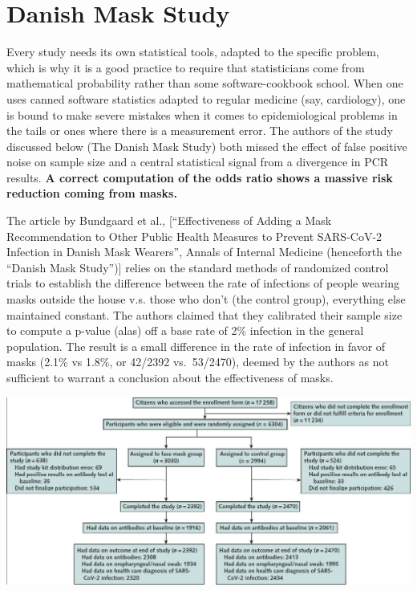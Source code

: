\documentclass[
]{book}
\begin{document}
\hypertarget{danish-mask-study}{%
\section{Danish Mask Study}\label{danish-mask-study}}

Every study needs its own statistical tools, adapted to the specific problem, which is why it is a good practice to require that statisticians come from mathematical probability rather than some software-cookbook school. When one uses canned software statistics adapted to regular medicine (say, cardiology), one is bound to make severe mistakes when it comes to epidemiological problems in the tails or ones where there is a measurement error. The authors of the study discussed below (The Danish Mask Study) both missed the effect of false positive noise on sample size and a central statistical signal from a divergence in PCR results.
\textbf{A correct computation of the odds ratio shows a massive risk reduction coming from masks.}

The article by Bundgaard et al., {[}``Effectiveness of Adding a Mask Recommendation to Other Public Health Measures to Prevent SARS-CoV-2 Infection in Danish Mask Wearers'', Annals of Internal Medicine (henceforth the ``Danish Mask Study''){]} relies on the standard methods of randomized control trials to establish the difference between the rate of infections of people wearing masks outside the house v.s. those who don't (the control group), everything else maintained constant.
The authors claimed that they calibrated their sample size to compute a p-value (alas) off a base rate of 2\% infection in the general population.
The result is a small difference in the rate of infection in favor of masks (2.1\% vs 1.8\%, or 42/2392 vs.~53/2470), deemed by the authors as not sufficient to warrant a conclusion about the effectiveness of masks.

\includegraphics{fig/Bundgaard_Study_Flow.jpg}
\end{document}

